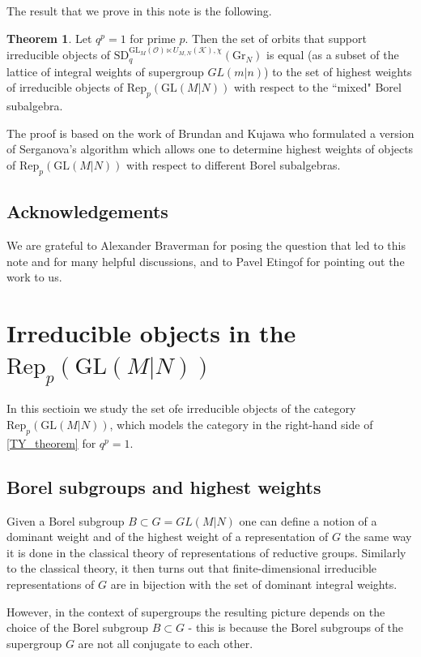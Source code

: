 \documentclass[12pt]{amsart}
\numberwithin{equation}{section}
\numberwithin{equation}{section}
\theoremstyle{definition}
\newtheorem{theorem}{Theorem}
\begin{document}
The result that we prove in this note is the following.
\begin{theorem}
    Let $q^p=1$ for prime $p$. Then the set of orbits that support irreducible objects of $\mathrm{SD}_q^{\mathrm{GL}_M(\mathcal{O}) \ltimes U_{M,N}(\mathcal{K}), \chi}(\mathrm{Gr}_N)$ is equal (as a subset of the lattice of integral weights of supergroup $GL(m|n)$) to the set of highest weights of irreducible objects of $\mathrm{Rep}_p(\mathrm{GL}(M|N))$ with respect to the ``mixed" Borel subalgebra.
\end{theorem}

The proof is based on the work of Brundan and Kujawa \cite{bk} who formulated a version of Serganova's algorithm which allows one to determine highest weights of objects of $\mathrm{Rep}_p(\mathrm{GL}(M|N))$ with respect to different Borel subalgebras.

\subsection*{Acknowledgements}
We are grateful to Alexander Braverman for posing the question that led to this note and for many helpful discussions, and to Pavel Etingof for pointing out the work \cite{bk} to us.


 
\section{Irreducible objects in the $\mathrm{Rep}_p(\mathrm{GL}(M|N))$}
 
In this sectioin we study the set ofe irreducible objects of the category $\mathrm{Rep}_p(\mathrm{GL}(M|N))$, which models the category in the right-hand side of \ref{TY_theorem} for $q^p=1$.
\subsection{Borel subgroups and highest weights}

Given a Borel subgroup $B\subset G = GL(M|N)$ one can define a notion of a dominant weight and of the highest weight of a representation of $G$ the same way it is done in the classical theory of representations of reductive groups. Similarly to the classical theory, it then turns out that finite-dimensional irreducible representations of $G$ are in bijection with the set of dominant integral weights. 

However, in the context of supergroups the resulting picture depends on the choice of the Borel subgroup $B \subset G$ - this is because the Borel subgroups of the supergroup $G$ are not all conjugate to each other. 
\end{document}
